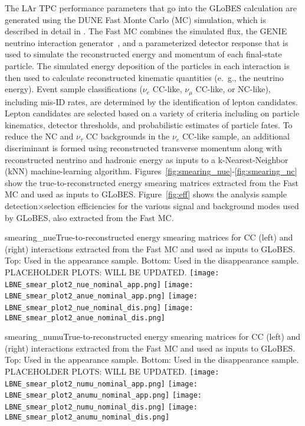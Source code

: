 The LAr TPC performance parameters that go into the GLoBES calculation are generated using the DUNE Fast Monte Carlo (MC) simulation, which is described in detail in \cite{Adams:2013qkq}.  The Fast MC combines the simulated flux, the GENIE neutrino interaction generator~\cite{Andreopoulos:2009rq}, and a parameterized detector response that is used to simulate the reconstructed energy and momentum of each final-state particle.  The simulated energy deposition of the particles in each interaction is then used to calculate reconstructed kinematic quantities (e.~g., the neutrino energy). Event sample classifications ($\nu_e$ CC-like, $\nu_{\mu}$ CC-like, or NC-like), including mis-ID rates, are determined by the identification of lepton candidates. Lepton candidates are selected based on a variety of criteria including on particle kinematics, detector thresholds, and probabilistic estimates of particle fates. To reduce the NC and $\nu_{\tau}$ CC backgrounds in the $\nu_e$ CC-like sample, an additional discriminant is formed using reconstructed transverse momentum along with reconstructed neutrino and hadronic energy as inputs to a k-Nearest-Neighbor (kNN) machine-learning algorithm.  Figures~\ref{fig:smearing_nue}-\ref{fig:smearing_nc} show the true-to-reconstructed energy smearing matrices extracted from the Fast MC and used as inputs to GLoBES.  Figure~\ref{fig:eff} shows the analysis sample detection$\times$selection efficiencies for the various signal and background modes used by GLoBES, also extracted from the Fast MC.

\begin{cdrfigure}{smearing_nue}{True-to-reconstructed energy smearing matrices for CC \nue (left) and \anue (right) interactions extracted from the Fast MC and used as inputs to GLoBES.  Top: Used in the appearance sample.  Bottom: Used in the disappearance sample. PLACEHOLDER PLOTS: WILL BE UPDATED.}
 \texttt{[image: LBNE\_smear\_plot2\_nue\_nominal\_app.png]}
 \texttt{[image: LBNE\_smear\_plot2\_anue\_nominal\_app.png]}
 \texttt{[image: LBNE\_smear\_plot2\_nue\_nominal\_dis.png]}
 \texttt{[image: LBNE\_smear\_plot2\_anue\_nominal\_dis.png]}
\end{cdrfigure}

\begin{cdrfigure}{smearing_numu}{True-to-reconstructed energy smearing matrices for CC \numu (left) and \anumu (right) interactions extracted from the Fast MC and used as inputs to GLoBES.  Top: Used in the appearance sample.  Bottom: Used in the disappearance sample. PLACEHOLDER PLOTS: WILL BE UPDATED.}
 \texttt{[image: LBNE\_smear\_plot2\_numu\_nominal\_app.png]}
 \texttt{[image: LBNE\_smear\_plot2\_anumu\_nominal\_app.png]}
 \texttt{[image: LBNE\_smear\_plot2\_numu\_nominal\_dis.png]}
 \texttt{[image: LBNE\_smear\_plot2\_anumu\_nominal\_dis.png]}
\end{cdrfigure}

